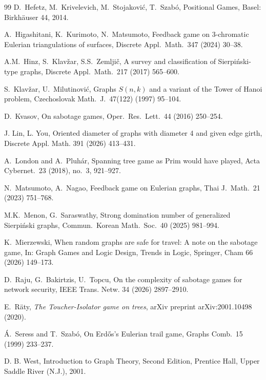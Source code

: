\documentclass[12pt]{article}
\begin{document}
\begin{thebibliography}{99}
D.~Hefetz, M.~Krivelevich, M.~Stojakovi\'{c}, T.~Szab\'{o},
Positional Games,
Basel: Birkh\"{a}user 44, 2014.

A.~Higashitani, K.~Kurimoto, N.~Matsumoto, 
Feedback game on 3-chromatic Eulerian triangulations of surfaces,
Discrete Appl.\ Math.\ 347 (2024) 30--38.

A.M.~Hinz, S.~Klav\v zar, S.S.~Zemlji\v c,
A survey and classification of Sierpi\'{n}ski-type graphs,
Discrete Appl.\ Math.\ 217 (2017) 565--600.

S.~Klav\v zar, U.~Milutinovi\'c,
Graphs $S(n,k)$ and a variant of the Tower of Hanoi problem,
Czechoslovak Math.\ J.\ 47(122) (1997) 95--104.

D.~Kvasov, 
On sabotage games, 
Oper.\ Res.\ Lett.\ 44 (2016) 250--254.

J. Lin, L. You,
Oriented diameter of graphs with diameter 4 and given edge girth,
Discrete Appl. Math. 391 (2026) 413--431. 

A.~London and A.~Pluh\'{a}r,
Spanning tree game as Prim would have played,
Acta Cybernet.\ 23 (2018), no.~3, 921--927.

N.~Matsumoto, A.~Nagao, 
Feedback game on Eulerian graphs,
Thai J.\ Math.\ 21 (2023) 751--768.

M.K.~Menon, G.~Saraswathy,
Strong domination number of generalized Sierpi\'{n}ski graphs,
Commun.\ Korean Math.\ Soc.\ 40 (2025) 981--994.

K.~Mierzewski, 
When random graphs are safe for travel: A note on the sabotage game,
In: Graph Games and Logic Design,
Trends in Logic, Springer, Cham 66 (2026) 149--173.

D.~Raju, G.~Bakirtzis, U.~Topcu,
On the complexity of sabotage games for network security,
IEEE Trans. Netw. 34 (2026) 2897--2910.

E.~R\"{a}ty,
\textit{The Toucher-Isolator game on trees},
arXiv preprint arXiv:2001.10498 (2020).

\'{A}.~Seress and T.~Szab\'{o},
On Erd\H{o}s's Eulerian trail game,
Graphs Comb.\ 15 (1999) 233--237.

D. B. West, 
Introduction to Graph Theory, Second Edition,
Prentice Hall, Upper Saddle River (N.J.), 2001.

\end{thebibliography}
\end{document}
